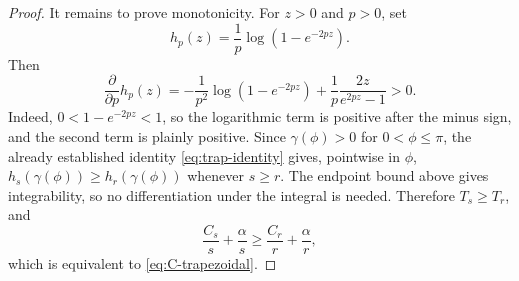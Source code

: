 \documentclass[10pt,a4paper]{amsart}
\begin{document}
\begin{proof}
It remains to prove monotonicity. For $z>0$ and $p>0$, set
\[
  h_p(z)=\frac1p\log(1-e^{-2pz}).
\]
Then
\[
  \frac{\partial}{\partial p}h_p(z)
  =
  -\frac1{p^2}\log(1-e^{-2pz})
  +
  \frac1p\frac{2z}{e^{2pz}-1}
  >0.
\]
Indeed, $0<1-e^{-2pz}<1$, so the logarithmic term is positive after the minus sign, and the second term is plainly positive. Since $\gamma(\phi)>0$ for $0<\phi\le\pi$, the already established identity \eqref{eq:trap-identity} gives, pointwise in $\phi$, $h_s(\gamma(\phi))\ge h_r(\gamma(\phi))$ whenever $s\ge r$. The endpoint bound above gives integrability, so no differentiation under the integral is needed. Therefore $T_s\ge T_r$, and
\[
  \frac{C_s}{s}+\frac{\alpha}{s}
  \ge
  \frac{C_r}{r}+\frac{\alpha}{r},
\]
which is equivalent to \eqref{eq:C-trapezoidal}.
\end{proof}
\end{document}
